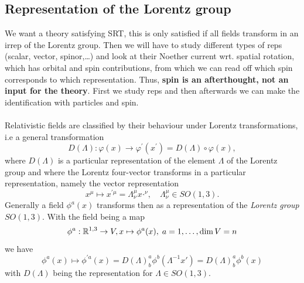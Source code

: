 \subsection{Representation of the Lorentz group}
We want a theory satisfying SRT, this is only satisfied if all fields transform in an irrep of the Lorentz group. Then we will have to study different types of reps (scalar, vector, spinor,\dots) and look at their Noether current wrt. spatial rotation, which has orbital and spin contributions, from which we can read off which spin corresponds to which representation. Thus, \textbf{spin is an afterthought, not an input for the theory}. First we study reps and then afterwards we can make the identification with particles and spin.\\
\\
Relativistic fields are classified by their behaviour under Lorentz transformations, i.e a general transformation
\begin{equation}
	D(\Lambda): \varphi(x) \rightarrow \varphi^\prime (x^\prime) = D(\Lambda) \circ \varphi(x),
\end{equation}
where $D(\Lambda)$ is a particular representation of the element $\Lambda$ of the Lorentz group and where the Lorentz four-vector transforms in a particular representation, namely the vector representation
\begin{equation}
x^{\mu} \mapsto x^{' \mu} = \Lambda^{\mu}_{\nu} x^{¸\nu}, \quad \Lambda^{\mu}_{\nu} \in SO(1,3).
\end{equation}
Generally a field $\phi^a(x)$ transforms then as a representation of the \emph{Lorentz group} $SO(1,3)$. With the field being a map
\begin{equation}
\phi^a :\mathbb{R}^{1,3} \rightarrow V, x\mapsto \phi^a(x), \; a=1,\dots, \dim V=n
\end{equation}
we have
\begin{equation}
\phi^a(x) \mapsto \phi^{'a} (x) = D(\Lambda)^a_b \phi^b (\Lambda^{-1} x') = D(\Lambda)^a_b \phi^b(x)
\end{equation}
with $D(\Lambda)$ being the representation for $\Lambda \in SO(1,3)$.
